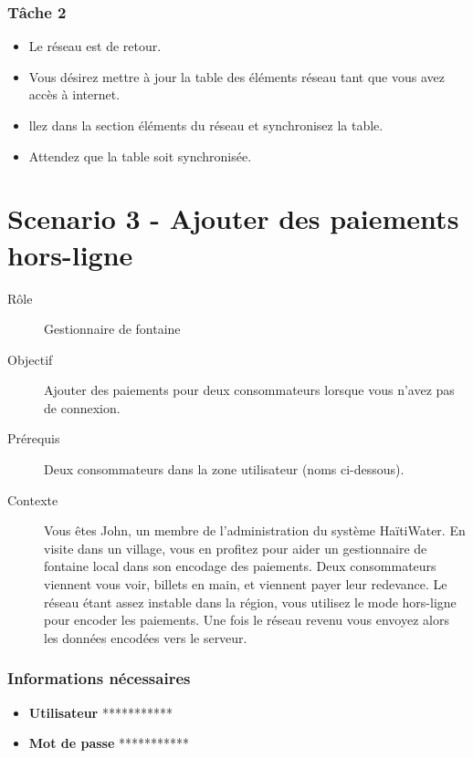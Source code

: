 \documentclass{EPL-master-thesis-covers-FR}
\begin{document}
				\subsubsection*{Tâche 2}
					\begin{itemize}
						\item Le réseau est de retour. 
						\item Vous désirez mettre à jour la table des éléments réseau tant que vous avez accès à internet. 
						\item llez dans la section éléments du réseau et synchronisez la table. 
						\item Attendez que la table soit synchronisée. 
					\end{itemize}
			
			
\newpage
			\section*{Scenario 3 - Ajouter des paiements hors-ligne}
				\begin{description}
					\item[Rôle] Gestionnaire de fontaine 
					\item[Objectif] Ajouter des paiements pour deux consommateurs lorsque vous n’avez pas de connexion. 
					\item[Prérequis] Deux consommateurs dans la zone utilisateur (noms ci-dessous).  
					\item[Contexte] Vous êtes John, un membre de l’administration du système HaïtiWater. En visite dans un village, vous en profitez pour aider un gestionnaire de fontaine local dans son encodage des paiements. Deux consommateurs viennent vous voir, billets en main, et viennent payer leur redevance. Le réseau étant assez instable dans la région, vous utilisez le mode hors-ligne pour encoder les paiements. Une fois le réseau revenu vous envoyez alors les données encodées vers le serveur. 
				\end{description}
							
				\subsubsection*{Informations nécessaires}
					\begin{itemize}[noitemsep, label={}]
						\item \textbf{Utilisateur} ***********
						\item \textbf{Mot de passe} ***********
					\end{itemize}
					
\end{document}
